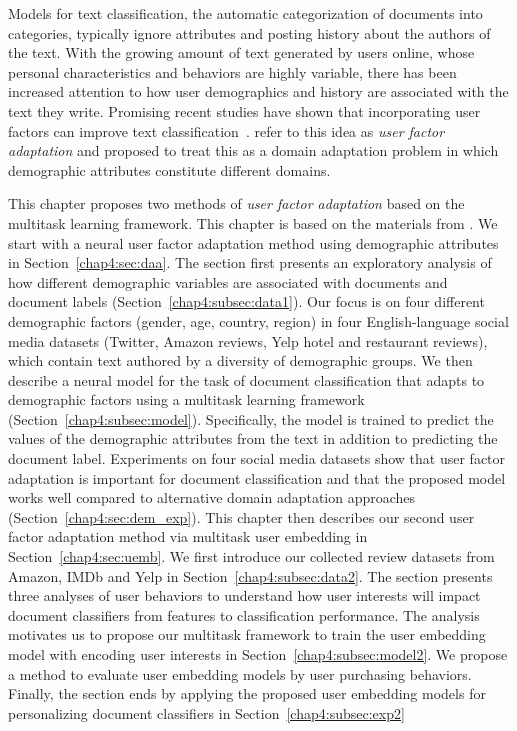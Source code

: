 Models for text classification, the automatic categorization of documents into categories, typically ignore attributes and posting history about the authors of the text.
With the growing amount of text generated by users online, whose personal characteristics and behaviors are highly variable,
there has been increased attention to how user demographics and history are associated with the text they write.
Promising recent studies have shown that incorporating user factors can improve text classification~\cite{volkova2013exploring, hovy2015demographic, amir2016modelling, yang2017overcoming, li2018towards, pan2019social}. 
\cite{lynn2017human} refer to this idea as {\em user factor adaptation}
and proposed to treat this as a domain adaptation problem in which demographic attributes constitute different domains.

This chapter proposes two methods of \textit{user factor adaptation} based on the multitask learning framework. 
This chapter is based on the materials from \cite{huang2019neuraluser, huang2020user}.
We start with a neural user factor adaptation method using demographic attributes in Section~\ref{chap4:sec:daa}.
The section first presents an exploratory analysis of how different demographic variables are associated with documents and document labels (Section~\ref{chap4:subsec:data1}).
Our focus is on four different demographic factors (gender, age, country, region) in four English-language social media datasets (Twitter, Amazon reviews, Yelp hotel and restaurant reviews), which contain text authored by a diversity of demographic groups.
We then describe a neural model for the task of document classification that adapts to demographic factors using a multitask learning framework (Section~\ref{chap4:subsec:model}). Specifically, the model is trained to predict the values of the demographic attributes from the text in addition to predicting the document label. 
Experiments on four social media datasets show that user factor adaptation is important for document classification and that the proposed model works well compared to alternative domain adaptation approaches (Section~\ref{chap4:sec:dem_exp}).
This chapter then describes our second user factor adaptation method via multitask user embedding in Section~\ref{chap4:sec:uemb}.
We first introduce our collected review datasets from Amazon, IMDb and Yelp in Section~\ref{chap4:subsec:data2}.
The section presents three analyses of user behaviors to understand how user interests will impact document classifiers from features to classification performance.
The analysis motivates us to propose our multitask framework to train the user embedding model with encoding user interests in Section~\ref{chap4:subsec:model2}. 
We propose a method to evaluate user embedding models by user purchasing behaviors. 
Finally, the section ends by applying the proposed user embedding models for personalizing document classifiers in Section~\ref{chap4:subsec:exp2}

